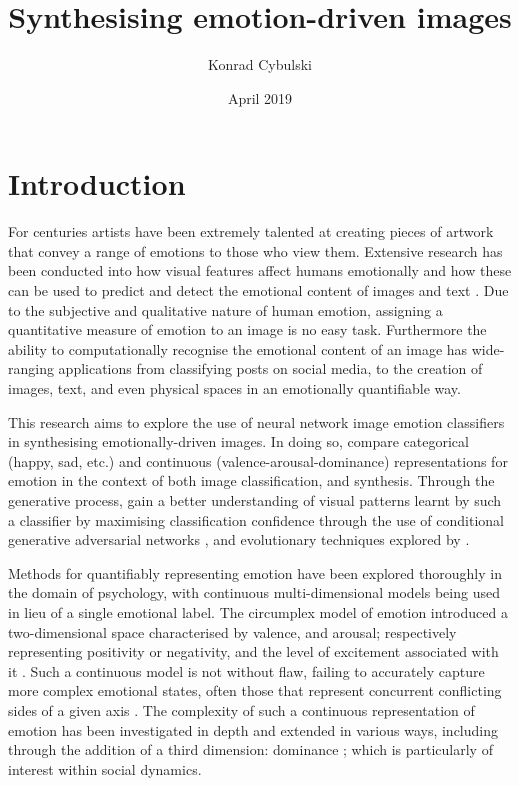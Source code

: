 \documentclass{article}
\title{Synthesising emotion-driven images}
\author{Konrad Cybulski}
\date{April 2019}
\begin{document}
	
\maketitle

\section{Introduction}

For centuries artists have been extremely talented at creating pieces of artwork that convey a range of emotions to those who view them.
Extensive research has been conducted into how visual features affect humans emotionally and how these can be used to predict and detect the emotional content of images and text \citep{machajdik2010affective, zhao2014exploring}.
Due to the subjective and qualitative nature of human emotion, assigning a quantitative measure of emotion to an image is no easy task.
Furthermore the ability to computationally recognise the emotional content of an image has wide-ranging applications from classifying posts on social media, to the creation of images, text, and even physical spaces in an emotionally quantifiable way.

This research aims to explore the use of neural network image emotion classifiers in synthesising emotionally-driven images.
In doing so, compare categorical (happy, sad, etc.) and continuous (valence-arousal-dominance) representations for emotion in the context of both image classification, and synthesis.
Through the generative process, gain a better understanding of visual patterns learnt by such a classifier by maximising classification confidence through the use of conditional generative adversarial networks \citep{gauthier2014conditional}, and evolutionary techniques explored by \citep{nguyen2015deep}.

Methods for quantifiably representing emotion have been explored thoroughly in the domain of psychology, with continuous multi-dimensional models being used in lieu of a single emotional label.
The circumplex model of emotion introduced a two-dimensional space characterised by valence, and arousal; respectively representing positivity or negativity, and the level of excitement associated with it \citep{russell1980circumplex}.
Such a continuous model is not without flaw, failing to accurately capture more complex emotional states, often those that represent concurrent conflicting sides of a given axis \citep{larsen1992promises}.
The complexity of such a continuous representation of emotion has been investigated in depth and extended in various ways, including through the addition of a third dimension: dominance \citep{bradley1994measuring}; which is particularly of interest within social dynamics.
\end{document}
